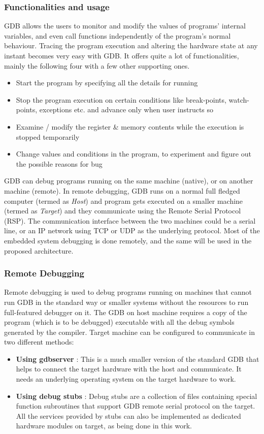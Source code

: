 \subsubsection{Functionalities and usage}
GDB allows the users to monitor and modify the values of programs' internal variables, and even call functions independently of the program's normal behaviour. Tracing the program execution and altering the hardware state at any instant becomes very easy with GDB. It offers quite a lot of functionalities, mainly the following four with a few other supporting ones.
\begin{itemize}
	\item Start the program by specifying all the details for running
	\item Stop the program execution on certain conditions like break-points, watch-points, exceptions etc. and advance only when user instructs so
	\item Examine / modify the register \& memory contents while the execution is stopped temporarily
	\item Change values and conditions in the program, to experiment and figure out the possible reasons for bug
\end{itemize}

GDB can debug programs running on the same machine (native), or on another machine (remote). In remote debugging, GDB runs on a normal full fledged computer (termed as \textit{Host}) and program gets executed on a smaller machine (termed as \textit{Target}) and they communicate using the Remote Serial Protocol (RSP)\cite{gdbEmbecosm}. The communication interface between the two machines could be a serial line, or an IP network using TCP or UDP as the underlying protocol. Most of the embedded system debugging is done remotely, and the same will be used in the proposed architecture.

\subsubsection{Remote Debugging}
Remote debugging is used to debug programs running on machines that cannot run GDB in the standard way or smaller systems without the resources to run full-featured debugger on it. The GDB on host machine requires a copy of the program (which is to be debugged) executable with all the debug symbols generated by the compiler. Target machine can be configured to communicate in two different methods:

\begin{itemize}
	\item \textbf{Using gdbserver} : This is a much smaller version of the standard GDB that helps to connect the target hardware with the host and communicate. It needs an underlying operating system on the target hardware to work.
	
	\item \textbf{Using debug stubs} : Debug stubs are a collection of files containing special function subroutines that support GDB remote serial protocol on the target. All the services provided by stubs can also be implemented as dedicated hardware modules on target, as being done in this work.
\end{itemize}

